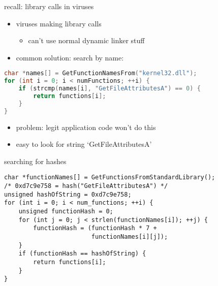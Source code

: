 \begin{frame}[fragile,label=virusLibCall]{recall: library calls in viruses}
    \begin{itemize}
    \item viruses making library calls
        \begin{itemize}
        \item can't use normal dynamic linker stuff
        \end{itemize}
    \item common solution: search by name:
    \end{itemize}
\begin{lstlisting}[language=C++,style=smaller]
char *names[] = GetFunctionNamesFrom("kernel32.dll");
for (int i = 0; i < numFunctions; ++i) {
    if (strcmp(names[i], "GetFileAttributesA") == 0) {
        return functions[i];
    }
}
\end{lstlisting}
    \begin{itemize}
    \item problem: legit application code won't do this
    \item easy to look for string `GetFileAttributesA'
    \end{itemize}
\end{frame}

\begin{frame}[fragile,label=recallHideAPI]{searching for hashes}
\lstset{language=C,style=small}
\begin{lstlisting}
char *functionNames[] = GetFunctionsFromStandardLibrary();
/* 0xd7c9e758 = hash("GetFileAttributesA") */
unsigned hashOfString = 0xd7c9e758; 
for (int i = 0; i < num_functions; ++i) {
    unsigned functionHash = 0; 
    for (int j = 0; j < strlen(functionNames[i]); ++j) {
        functionHash = (functionHash * 7 +
                        functionNames[i][j]);
    }
    if (functionHash == hashOfString) {
        return functions[i];
    }
}
\end{lstlisting}
\end{frame}
